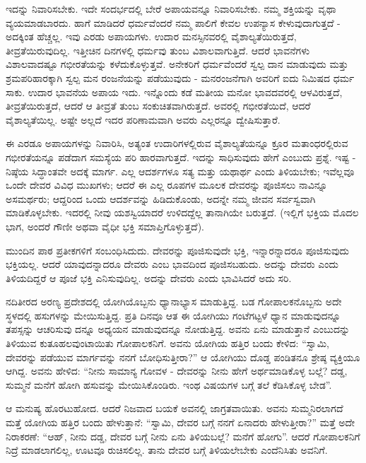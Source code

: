 ಇದನ್ನು ನಿವಾರಿಸಬೇಕು. ಇದೇ ಸಂದರ್ಭದಲ್ಲಿ ಬೇರೆ ಅಪಾಯವನ್ನೂ ನಿವಾರಿಸಬೇಕು. ನಮ್ಮ ಶಕ್ತಿಯನ್ನು ವೃಥಾ ವ್ಯಯಮಾಡಬಾರದು. ಹಾಗೆ ಮಾಡಿದರೆ ಧರ್ಮವೆಂದರೆ ನಮ್ಮ ಪಾಲಿಗೆ ಕೇವಲ ಉಪನ್ಯಾಸ ಕೇಳುವುದಾಗುತ್ತದೆ - ಅದಕ್ಕಿಂತ ಹೆಚ್ಚಲ್ಲ. ಇವು ಎರಡು ಅಪಾಯಗಳು. ಉದಾರ ಮನಸ್ಸಿನವರಲ್ಲಿ ವೈಶಾಲ್ಯತೆಯಿರುತ್ತದೆ, ತೀವ್ರತೆಯಿರುವುದಿಲ್ಲ. ಇತ್ತೀಚಿನ ದಿನಗಳಲ್ಲಿ ಧರ್ಮವು ತುಂಬ ವಿಶಾಲವಾಗುತ್ತಿದೆ. ಆದರೆ ಭಾವನೆಗಳು ವಿಶಾಲವಾದಷ್ಟೂ ಗಭೀರತೆಯನ್ನು ಕಳೆದುಕೊಳ್ಳುತ್ತವೆ. ಅನೇಕರಿಗೆ ಧರ್ಮವೆಂದರೆ ಸ್ವಲ್ಪ ದಾನ ಮಾಡುವುದು ಮತ್ತು ಶ್ರಮಪರಿಹಾರಕ್ಕಾಗಿ ಸ್ವಲ್ಪ ಮನ ರಂಜನೆಯನ್ನು ಪಡೆಯುವುದು - ಮನರಂಜನೆಗಾಗಿ ಅವರಿಗೆ ಐದು ನಿಮಿಷದ ಧರ್ಮ ಸಾಕು. ಉದಾರ ಭಾವನೆಯ ಅಪಾಯ ಇದು. ಇನ್ನೊಂದು ಕಡೆ ಮತೀಯ ಮನೋ ಭಾವದವರಲ್ಲಿ ಆಳವಿರುತ್ತದೆ, ತೀವ್ರತೆಯಿರುತ್ತದೆ, ಆದರೆ ಆ ತೀವ್ರತೆ ತುಂಬ ಸಂಕುಚಿತವಾಗಿರುತ್ತದೆ. ಅವರಲ್ಲಿ ಗಭೀರತೆಯಿದೆ, ಆದರೆ ವೈಶಾಲ್ಯತೆಯಿಲ್ಲ. ಅಷ್ಟೇ ಅಲ್ಲದೆ ಇದರ ಪರಿಣಾಮವಾಗಿ ಅವರು ಎಲ್ಲರನ್ನೂ ದ್ವೇಷಿಸುತ್ತಾರೆ.

ಈ ಎರಡೂ ಅಪಾಯಗಳನ್ನು ನಿವಾರಿಸಿ, ಅತ್ಯಂತ ಉದಾರಿಗಳಲ್ಲಿರುವ ವೈಶಾಲ್ಯತೆಯನ್ನೂ ಕ್ರೂರ ಮತಾಂಧರಲ್ಲಿರುವ ಗಭೀರತೆಯನ್ನೂ ಪಡೆದಾಗ ಸಮಸ್ಯೆಯ ಪರಿ ಹಾರವಾಗುತ್ತದೆ. ಇದನ್ನು ಸಾಧಿಸುವುದು ಹೇಗೆ ಎಂಬುದು ಪ್ರಶ್ನೆ. ಇಷ್ಟ - ನಿಷ್ಠೆಯ ಸಿದ್ಧಾಂತವೇ ಅದಕ್ಕೆ ಮಾರ್ಗ. ಎಲ್ಲ ಆದರ್ಶಗಳೂ ಸತ್ಯ ಮತ್ತು ಯಥಾರ್ಥ ಎಂದು ತಿಳಿಯಬೇಕು; ಇವೆಲ್ಲವೂ ಒಂದೇ ದೇವರ ವಿವಿಧ ಮುಖಗಳು; ಆದರೆ ಈ ಎಲ್ಲ ರೂಪಗಳ ಮೂಲಕ ದೇವರನ್ನು ಪೂಜಿಸಲು ನಾವಿನ್ನೂ ಅಸಮರ್ಥರು; ಆದ್ದರಿಂದ ಒಂದು ಆದರ್ಶವನ್ನು ಹಿಡಿದುಕೊಂಡು, ಅದನ್ನೇ ನಮ್ಮ ಜೀವನ ಸರ್ವಸ್ವವಾಗಿ ಮಾಡಿಕೊಳ್ಳಬೇಕು. ಇದರಲ್ಲಿ ನೀವು ಯಶಸ್ವಿಯಾದರೆ ಉಳಿದದ್ದೆಲ್ಲ ತಾನಾಗಿಯೇ ಬರುತ್ತದೆ. (ಇಲ್ಲಿಗೆ ಭಕ್ತಿಯ ಮೊದಲ ಭಾಗ, ಅಂದರೆ ಗೌಣೀ ಅಥವಾ ವೈಧೀ ಭಕ್ತಿ ಸಮಾಪ್ತಿಗೊಳ್ಳುತ್ತದೆ).

ಮುಂದಿನ ಪಾಠ ಪ್ರತೀಕಗಳಿಗೆ ಸಂಬಂಧಿಸಿದುದು. ದೇವರನ್ನು ಪೂಜಿಸುವುದೇ ಭಕ್ತಿ, ಇನ್ನಾರನ್ನಾದರೂ ಪೂಜಿಸುವುದು ಭಕ್ತಿಯಲ್ಲ. ಆದರೆ ಯಾವುದನ್ನಾದರೂ ದೇವರು ಎಂಬ ಭಾವದಿಂದ ಪೂಜಿಸಬಹುದು. ಅದನ್ನು ದೇವರು ಎಂದು ತಿಳಿಯದಿದ್ದರೆ ಆ ಪೂಜೆ ಭಕ್ತಿ ಎನಿಸುವುದಿಲ್ಲ. ಅದನ್ನು ದೇವರು ಎಂದು ಭಾವಿಸಿದರೆ ಅದು ಸರಿ.

ನದಿತೀರದ ಅರಣ್ಯ ಪ್ರದೇಶದಲ್ಲಿ ಯೋಗಿಯೊಬ್ಬನು ಧ್ಯಾನಾಭ್ಯಾಸ ಮಾಡುತ್ತಿದ್ದ. ಬಡ ಗೋಪಾಲಕನೊಬ್ಬನು ಅದೇ ಸ್ಥಳದಲ್ಲಿ ಹಸುಗಳನ್ನು ಮೇಯಿಸುತ್ತಿದ್ದ. ಪ್ರತಿ ದಿನವೂ ಆತ ಈ ಯೋಗಿಯು ಗಂಟೆಗಟ್ಟಳೆ ಧ್ಯಾನ ಮಾಡುವುದನ್ನೂ ತಪಸ್ಸನ್ನು ಆಚರಿಸುವು ದನ್ನೂ ಅಧ್ಯಯನ ಮಾಡುವುದನ್ನೂ ನೋಡುತ್ತಿದ್ದ. ಅವನು ಏನು ಮಾಡುತ್ತಾನೆ ಎಂಬುದನ್ನು ತಿಳಿಯುವ ಕುತೂಹಲವುಂಟಾಯಿತು ಗೋಪಾಲಕನಿಗೆ. ಅವನು ಯೋಗಿಯ ಹತ್ತಿರ ಬಂದು ಕೇಳಿದ: “ಸ್ವಾಮಿ, ದೇವರನ್ನು ಪಡೆಯುವ ಮಾರ್ಗವನ್ನು ನನಗೆ ಬೋಧಿಸುತ್ತೀರಾ?” ಆ ಯೋಗಿಯು ದೊಡ್ಡ ಪಂಡಿತನೂ ಶ್ರೇಷ್ಠ ವ್ಯಕ್ತಿಯೂ ಆಗಿದ್ದ. ಅವನು ಹೇಳಿದ: “ನೀನು ಸಾಮಾನ್ಯ ಗೋವಳ - ದೇವರನ್ನು ನೀನು ಹೇಗೆ ಅರ್ಥಮಾಡಿಕೊಳ್ಳ ಬಲ್ಲೆ? ದಡ್ಡ, ಸುಮ್ಮನೆ ಮನೆಗೆ ಹೋಗಿ ಹಸುವನ್ನು ಮೇಯಿಸಿಕೊಂಡಿರು. ಇಂಥ ವಿಷಯಗಳ ಬಗ್ಗೆ ತಲೆ ಕೆಡಿಸಿಕೊಳ್ಳ ಬೇಡ”.

ಆ ಮನುಷ್ಯ ಹೊರಟುಹೋದ. ಆದರೆ ನಿಜವಾದ ಬಯಕೆ ಅವನಲ್ಲಿ ಜಾಗ್ರತವಾಯಿತು. ಅವನು ಸುಮ್ಮನಿರಲಾಗದೆ ಮತ್ತೆ ಯೋಗಿಯ ಹತ್ತಿರ ಬಂದು ಹೇಳುತ್ತಾನೆ: “ಸ್ವಾಮಿ, ದೇವರ ಬಗ್ಗೆ ನನಗೆ ಏನಾದರು ಹೇಳುತ್ತೀರಾ?” ಮತ್ತೆ ಅದೇ ನಿರಾಕರಣೆ: “ಆಹ್, ನೀನು ದಡ್ಡ, ದೇವರ ಬಗ್ಗೆ ನೀನು ಏನು ತಿಳಿಯಬಲ್ಲೆ? ಮನೆಗೆ ಹೋಗು”. ಆದರೆ ಗೋಪಾಲಕನಿಗೆ ನಿದ್ರೆ ಮಾಡಲಾಗಲಿಲ್ಲ, ಊಟವೂ ರುಚಿಸಲಿಲ್ಲ. ತಾನು ದೇವರ ಬಗ್ಗೆ ತಿಳಿಯಲೇಬೇಕು ಎಂದೆನಿಸಿತು ಅವನಿಗೆ.

